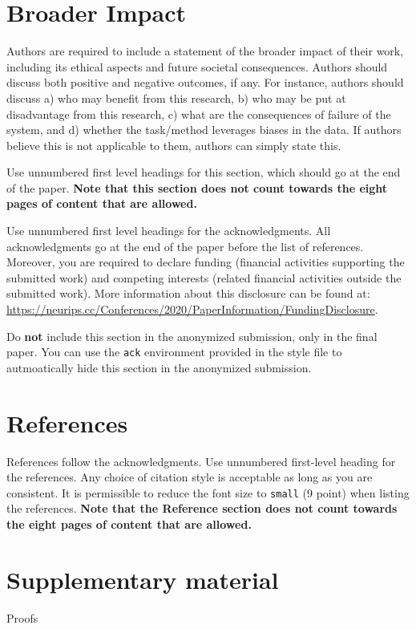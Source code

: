 \documentclass{article}
\begin{document}
\section*{Broader Impact}

Authors are required to include a statement of the broader impact of their work, including its ethical aspects and future societal consequences. 
Authors should discuss both positive and negative outcomes, if any. For instance, authors should discuss a) 
who may benefit from this research, b) who may be put at disadvantage from this research, c) what are the consequences of failure of the system, and d) whether the task/method leverages
biases in the data. If authors believe this is not applicable to them, authors can simply state this.

Use unnumbered first level headings for this section, which should go at the end of the paper. {\bf Note that this section does not count towards the eight pages of content that are allowed.}

\begin{ack}
Use unnumbered first level headings for the acknowledgments. All acknowledgments
go at the end of the paper before the list of references. Moreover, you are required to declare 
funding (financial activities supporting the submitted work) and competing interests (related financial activities outside the submitted work). 
More information about this disclosure can be found at: \url{https://neurips.cc/Conferences/2020/PaperInformation/FundingDisclosure}.


Do {\bf not} include this section in the anonymized submission, only in the final paper. You can use the \texttt{ack} environment provided in the style file to autmoatically hide this section in the anonymized submission.
\end{ack}


\section*{References}

References follow the acknowledgments. Use unnumbered first-level heading for
the references. Any choice of citation style is acceptable as long as you are
consistent. It is permissible to reduce the font size to \verb+small+ (9 point)
when listing the references.
{\bf Note that the Reference section does not count towards the eight pages of content that are allowed.}
\medskip

\small





\newpage  
\appendix


\section{Supplementary material}

Proofs
\end{document}
